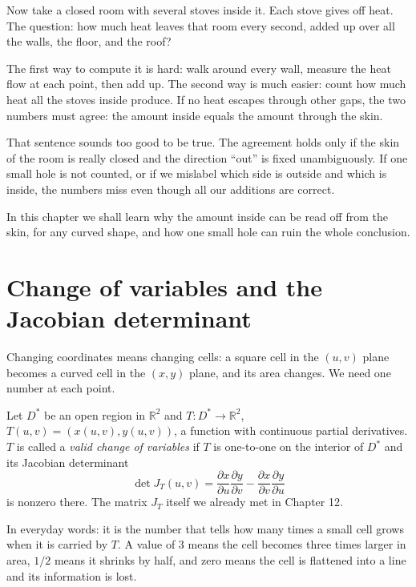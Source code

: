 \begin{untukanak}
Now take a closed room with several stoves inside it.
Each stove gives off heat. The question: how much heat leaves that room
every second, added up over all the walls, the floor, and the roof?

The first way to compute it is hard: walk around every wall, measure the heat
flow at each point, then add up. The second way is much easier: count
how much heat all the stoves inside produce. If no heat escapes
through other gaps, the two numbers must agree: the amount inside equals the
amount through the skin.

That sentence sounds too good to be true. The agreement holds only if
the skin of the room is really closed and the direction ``out'' is fixed unambiguously. If one small
hole is not counted, or if we mislabel which side is outside and
which is inside, the numbers miss even though all our additions are correct.

In this chapter we shall learn why the amount inside can be read off from the skin,
for any curved shape, and how one small hole can ruin
the whole conclusion.
\end{untukanak}

\section{Change of variables and the Jacobian determinant}

Changing coordinates means changing cells: a square cell in the $(u,v)$ plane
becomes a curved cell in the $(x,y)$ plane, and its area changes. We need
one number at each point.

\begin{definisi}
 Let $D^{*}$ be an open region in
$\mathbb{R}^{2}$ and $T\colon D^{*}\to\mathbb{R}^{2}$,
$T(u,v)=(x(u,v),y(u,v))$, a function with continuous partial derivatives. $T$ is called a
\emph{valid change of variables} if $T$ is one-to-one on the interior of
$D^{*}$ and its Jacobian determinant
\[
\det J_{T}(u,v)=\frac{\partial x}{\partial u}\frac{\partial y}{\partial v}
-\frac{\partial x}{\partial v}\frac{\partial y}{\partial u}
\]
is nonzero there. The matrix $J_{T}$ itself we already met in Chapter 12.
\end{definisi}

In everyday words: it is the number that tells how many times a small cell
grows when it is carried by $T$. A value of $3$ means the cell becomes three times larger in area, $1/2$ means it shrinks
by half, and zero means the cell is flattened into a line and its information is lost.

